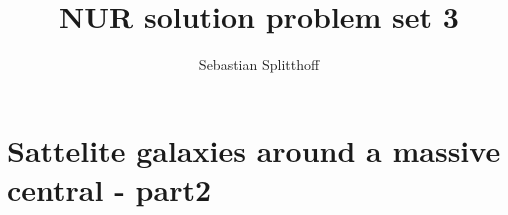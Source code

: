 \documentclass[a4paper,10pt]{article}
\title{NUR solution problem set 3}
\author{Sebastian Splitthoff}
\begin{document}
\maketitle

\section{Sattelite galaxies around a massive central - part2}







\end{document}
